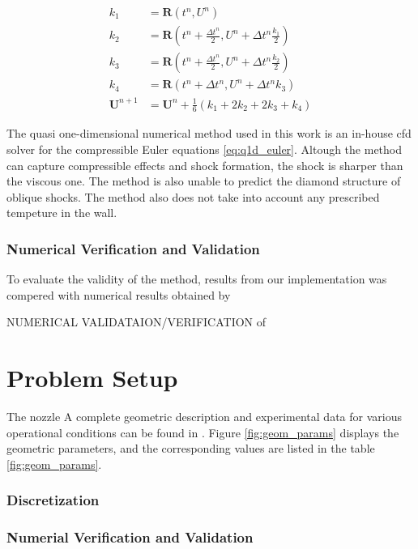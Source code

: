 \begin{align}
    k_1 &= \mathbf{R}(t^n, U^n)  \\
    k_2 &= \mathbf{R}(t^n + \frac{\Delta t^n}{2}, U^n +  \Delta t^n \frac{k_1}{2}) \\
    k_3 &= \mathbf{R}(t^n + \frac{\Delta t^n}{2}, U^n +  \Delta t^n \frac{k_2}{2}) \\
    k_4 &= \mathbf{R}(t^n + \Delta t^n, U^n + \Delta t^n k_3) \\
    \mathbf{U}^{n+1} &= \mathbf{U}^n + \frac{1}{6}(k_1 + 2k_2 + 2k_3 + k_4)
\end{align}

The quasi one-dimensional numerical method used in this work is an in-house cfd solver for the compressible Euler equations \eqref{eq:q1d_euler}. Altough the method can capture compressible effects and shock formation, the shock is sharper than the viscous one. The method is also unable to predict the diamond structure of oblique shocks. The method also does not take into account any prescribed tempeture in the wall. 

\subsubsection{Numerical Verification and Validation}

To evaluate the validity of the method, results from our implementation was compered with numerical results obtained by

NUMERICAL VALIDATAION/VERIFICATION of 

\section{Problem Setup}


The nozzle 
A complete geometric description and experimental data for various operational conditions can be found in \cite{Back1965a}. Figure \ref{fig:geom_params} displays the geometric parameters, and the corresponding values are listed in the table \ref{fig:geom_params}.




\subsubsection{Discretization}
\subsubsection{Numerial Verification and Validation}


